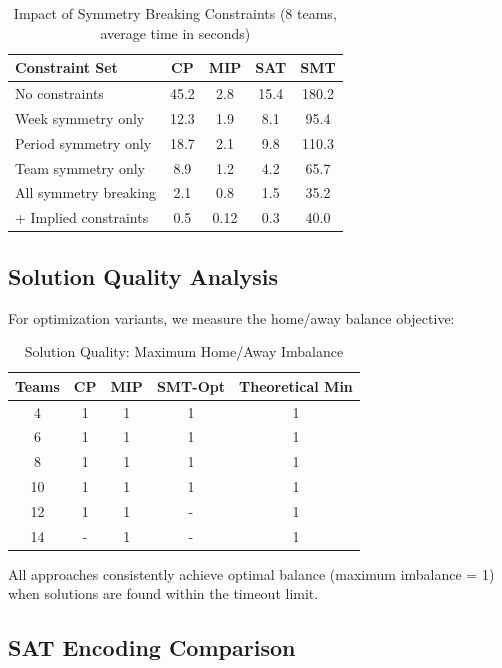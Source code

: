 \documentclass[11pt]{article}
\begin{document}
\begin{table}[H]
\centering
\caption{Impact of Symmetry Breaking Constraints (8 teams, average time in seconds)}
\label{tab:constraints}
\begin{tabular}{@{}lcccc@{}}
\toprule
\textbf{Constraint Set} & \textbf{CP} & \textbf{MIP} & \textbf{SAT} & \textbf{SMT} \\
\midrule
No constraints          & 45.2 & 2.8  & 15.4 & 180.2 \\
Week symmetry only      & 12.3 & 1.9  & 8.1  & 95.4  \\
Period symmetry only    & 18.7 & 2.1  & 9.8  & 110.3 \\
Team symmetry only      & 8.9  & 1.2  & 4.2  & 65.7  \\
All symmetry breaking   & 2.1  & 0.8  & 1.5  & 35.2  \\
+ Implied constraints   & 0.5  & 0.12 & 0.3  & 40.0  \\
\bottomrule
\end{tabular}
\end{table}

\subsection{Solution Quality Analysis}

For optimization variants, we measure the home/away balance objective:

\begin{table}[H]
\centering
\caption{Solution Quality: Maximum Home/Away Imbalance}
\label{tab:quality}
\begin{tabular}{@{}ccccc@{}}
\toprule
\textbf{Teams} & \textbf{CP} & \textbf{MIP} & \textbf{SMT-Opt} & \textbf{Theoretical Min} \\
\midrule
4  & 1 & 1 & 1 & 1 \\
6  & 1 & 1 & 1 & 1 \\
8  & 1 & 1 & 1 & 1 \\
10 & 1 & 1 & 1 & 1 \\
12 & 1 & 1 & - & 1 \\
14 & - & 1 & - & 1 \\
\bottomrule
\end{tabular}
\end{table}

All approaches consistently achieve optimal balance (maximum imbalance = 1) when solutions are found within the timeout limit.

\subsection{SAT Encoding Comparison}
\end{document}
